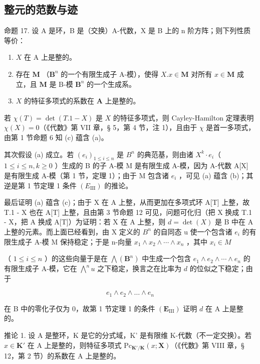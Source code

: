 \subsection{整元的范数与迹}

命题 17. 设 A 是环，B 是（交换）A-代数，X 是 B 上的 n 阶方阵；则下列性质等价：

\begin{enumerate}
\def\labelenumi{(\alph{enumi})}
\item
  \(X\) 在 A 上是整的。
\item
  存在 \(\mathbf{M}\) （\(\mathbf{B}^n\) 的一个有限生成子 A-模），使得 \(X.x\in \mathbf{M}\) 对所有 \(x\in \mathbf{M}\) 成立，且 \(\mathbf{M}\) 是 B-模 \(\mathbf{B}^n\) 的一个生成系。
\item
  \(X\) 的特征多项式的系数在 \(\mathbf{A}\) 上是整的。
\end{enumerate}

  若 \(\chi(T) = \det(T.1 - X)\) 是 \(X\) 的特征多项式，则 Cayley-Hamilton 定理表明 \(\chi(X) = 0\)（《代数》第 VII 章，§ 5，第 4 节，注 1），且由于 \(\chi\) 是首一多项式，由第 1 节命题 6 知 (c) 蕴含 (a)。

  其次假设 (a) 成立。若 \((e_i)_{1 \leqslant i \leqslant n}\) 是 \(B^n\) 的典范基，则由诸 \(X^k \cdot e_i\)（ \(1 \leqslant i \leqslant n, k \geqslant 0\) ）生成的 B 的子 A-模 M 是有限生成 A-模，因为 A-代数 A[X] 是有限生成 A-模（第 1 节，定理 1）；由于 M 包含诸 \(e_i\) ，可见 (a) 蕴含 (b)；其逆是第 1 节定理 1 条件 \((E_{\mathrm{III}})\) 的推论。

  最后证明 (a) 蕴含 (c)；由于 X 在 A 上整，从而更加在多项式环 A[T] 上整，故 T.1 - X 也在 A[T] 上整，且由第 3 节命题 12 可见，问题可化归（把 X 换成 T.1 - X，把 A 换成 A[T]）为证明：若 X 在 A 上整，则 \(d = \det(X)\) 是 B 中在 A 上整的元素。而上面已经看到，由 X 定义的 \(B^{n}\) 的自同态 u 使一个包含诸 \(e_{i}\) 的有限生成子 A-模 M 保持稳定；于是 n-向量 \(x_{1} \wedge x_{2} \wedge \cdots \wedge x_{n}\) ，其中 \(x_{i} \in M\)

（ \(1 \leqslant i \leqslant n\) ）的这些向量于是在 \(\bigwedge (\mathbf{B}^n)\) 中生成一个包含 \(e_1 \wedge e_2 \wedge \cdots \wedge e_n\) 的有限生成子 A-模，它在 \(\bigwedge^n u\) 之下稳定，换言之在比率为 \(d\) 的位似之下稳定；由于

\[
e _ {1} \wedge e _ {2} \wedge \dots \wedge e _ {n}
\]

在 B 中的零化子仅为 0，故第 1 节定理 1 的条件 \((\mathbf{E}_{\mathrm{III}})\) 证明 \(d\) 在 A 上是整的。

推论 1. 设 A 是整环，K 是它的分式域，K' 是有限维 K-代数（不一定交换）。若 \(x \in \mathbf{K}'\) 在 A 上是整的，则特征多项式 \(\mathrm{Pc}_{\mathbf{K}' / \mathbf{K}}(x; \mathbf{X})\)（《代数》第 VIII 章，§ 12，第 2 节）的系数在 A 上是整的。


